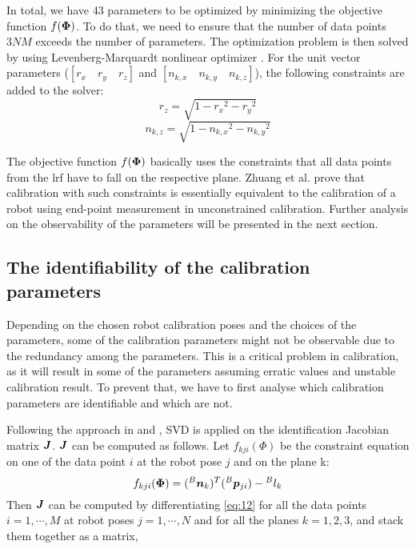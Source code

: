 In total, we have 43 parameters to be optimized by minimizing the objective function $f(\vb*{\Phi})$. To do that, we need to ensure that the number of data points $3NM$ exceeds the number of parameters. The optimization problem is then solved by using Levenberg-Marquardt nonlinear optimizer \cite{Newville2014}. For the unit vector parameters ($[r_x \quad r_y \quad r_z ]$ and  $[n_{k,x} \quad n_{k,y} \quad n_{k,z}]$), the following constraints are added to the solver:
\begin{equation}
\label{eq:10}
{r_z} = \sqrt{1 - {r_x}^2 - {r_y}^2}
\end{equation}
\begin{equation}
\label{eq:11}
n_{k,z} = \sqrt{1 - {n_{k,x}}^2 - {n_{k,y}}^2}
\end{equation}


The objective function $f(\vb*{\Phi})$ basically uses the constraints that all data points from the \ac{lrf} have to fall on the respective plane. Zhuang et al. \cite{Zhuang1999} prove that calibration with such constraints is essentially equivalent to the calibration of a robot using end-point measurement in unconstrained calibration. Further analysis on the observability of the parameters will be presented in the next section. 

\subsection{The identifiability of the calibration parameters}
\label{sec:third_step}

Depending on the chosen robot calibration poses and the choices of the parameters, some of the calibration parameters might not be observable due to the redundancy among the parameters. This is a critical problem in calibration, as it will result in some of the parameters assuming erratic values and unstable calibration result. To prevent that, we have to first analyse which calibration parameters are identifiable and which are not. 

Following the approach in \cite{Hollerbach1996} and \cite{Joubair2015}, SVD is applied on the identification Jacobian matrix $\vb*{J}$. $\vb*{J}$ can be computed as follows. Let  $f_{kji}(\Phi)$ be the constraint equation on one of the data point $i$ at the robot pose $j$ and on the plane k:
\begin{equation}
\label{eq:12}
 f_{kji}(\vb*{\Phi}) =  ({^B}\vb*{n}_k) ^T ({^B}\vb*{p}_{ji}) - {^B}l_k
\end{equation}
Then $\vb*{J}$ can be computed by differentiating \eqref{eq:12} for all the data points $i = 1, \cdots, M$ at robot poses $j = 1, \cdots, N$ and for all the planes $k=1,2,3$, and stack them together as a matrix,

